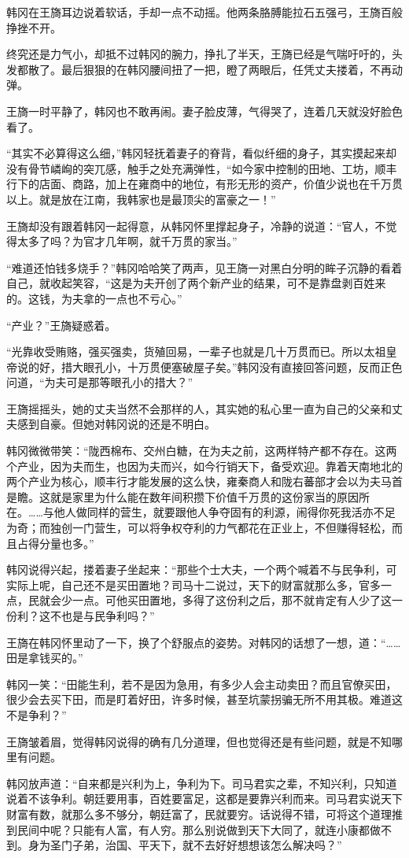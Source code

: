 韩冈在王旖耳边说着软话，手却一点不动摇。他两条胳膊能拉石五强弓，王旖百般挣挫不开。

终究还是力气小，却抵不过韩冈的腕力，挣扎了半天，王旖已经是气喘吁吁的，头发都散了。最后狠狠的在韩冈腰间扭了一把，瞪了两眼后，任凭丈夫搂着，不再动弹。

王旖一时平静了，韩冈也不敢再闹。妻子脸皮薄，气得哭了，连着几天就没好脸色看了。

“其实不必算得这么细，”韩冈轻抚着妻子的脊背，看似纤细的身子，其实摸起来却没有骨节嶙峋的突兀感，触手之处充满弹性，“如今家中控制的田地、工坊，顺丰行下的店面、商路，加上在雍商中的地位，有形无形的资产，价值少说也在千万贯以上。就是放在江南，我韩家也是最顶尖的富豪之一！”

王旖却没有跟着韩冈一起得意，从韩冈怀里撑起身子，冷静的说道：“官人，不觉得太多了吗？为官才几年啊，就千万贯的家当。”

“难道还怕钱多烧手？”韩冈哈哈笑了两声，见王旖一对黑白分明的眸子沉静的看着自己，就收起笑容，“这是为夫开创了两个新产业的结果，可不是靠盘剥百姓来的。这钱，为夫拿的一点也不亏心。”

“产业？”王旖疑惑着。

“光靠收受贿赂，强买强卖，货殖回易，一辈子也就是几十万贯而已。所以太祖皇帝说的好，措大眼孔小，十万贯便塞破屋子矣。”韩冈没有直接回答问题，反而正色问道，“为夫可是那等眼孔小的措大？”

王旖摇摇头，她的丈夫当然不会那样的人，其实她的私心里一直为自己的父亲和丈夫感到自豪。但她对韩冈说的还是不明白。

韩冈微微带笑：“陇西棉布、交州白糖，在为夫之前，这两样特产都不存在。这两个产业，因为夫而生，也因为夫而兴，如今行销天下，备受欢迎。靠着天南地北的两个产业为核心，顺丰行才能发展的这么快，雍秦商人和陇右蕃部才会以为夫马首是瞻。这就是家里为什么能在数年间积攒下价值千万贯的这份家当的原因所在。……与他人做同样的营生，就要跟他人争夺固有的利源，闹得你死我活亦不足为奇；而独创一门营生，可以将争权夺利的力气都花在正业上，不但赚得轻松，而且占得分量也多。”

韩冈说得兴起，搂着妻子坐起来：“那些个士大夫，一个两个喊着不与民争利，可实际上呢，自己还不是买田置地？司马十二说过，天下的财富就那么多，官多一点，民就会少一点。可他买田置地，多得了这份利之后，那不就肯定有人少了这一份利？这不也是与民争利吗？”

王旖在韩冈怀里动了一下，换了个舒服点的姿势。对韩冈的话想了一想，道：“……田是拿钱买的。”

韩冈一笑：“田能生利，若不是因为急用，有多少人会主动卖田？而且官僚买田，很少会去买下田，而是盯着好田，许多时候，甚至坑蒙拐骗无所不用其极。难道这不是争利？”

王旖皱着眉，觉得韩冈说得的确有几分道理，但也觉得还是有些问题，就是不知哪里有问题。

韩冈放声道：“自来都是兴利为上，争利为下。司马君实之辈，不知兴利，只知道说着不该争利。朝廷要用事，百姓要富足，这都是要靠兴利而来。司马君实说天下财富有数，就那么多不够分，朝廷富了，民就要穷。话说得不错，可将这个道理推到民间中呢？只能有人富，有人穷。那么别说做到天下大同了，就连小康都做不到。身为圣门子弟，治国、平天下，就不去好好想想该怎么解决吗？”

